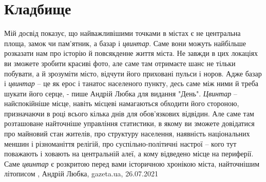  
 
 
 
 
\chapter{Кладбище}
\label{sec:slova.kladbische}

Мій досвід показує, що найважливішими точками в містах є не центральна площа,
замок чи пам'ятник, а базар і \emph{цвинтар}. Саме вони можуть найбільше розказати нам
про історію й повсякденне життя міста. Не завжди в цих локаціях ви зможете
зробити красиві фото, але саме там отримаєте шанс не тільки побувати, а й
зрозуміти місто, відчути його приховані пульси і норов. Адже базар і \emph{цвинтар} –
це як ерос і танатос населеного пункту, десь саме між ними й треба шукати його
серце, - пише Андрій Любка для видання "День".
\emph{Цвинтар} – найспокійніше місце, навіть місцеві намагаються обходити його
стороною, призначаючи в році всього кілька днів для обов'язкових відвідин. Але
саме там розташоване найточніше управління статистики, в якому ви зможете
довідатися про майновий стан жителів, про структуру населення, наявність
національних меншин і різноманіття релігій, про суспільно-політичні настрої –
кого тут поважають і ховають на центральній алеї, а кому відведено місце на
периферії. Саме \emph{цвинтар} є розкритою перед вами історичною хронікою міста,
найточнішим літописом
, 
Андрій Любка, gazeta.ua, 26.07.2021
